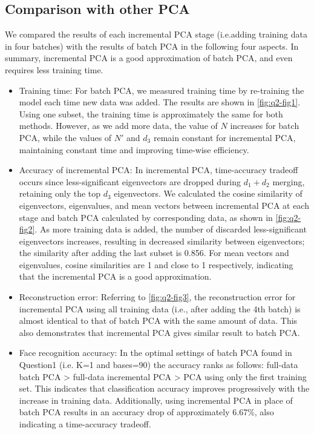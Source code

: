 \subsection{Comparison with other PCA}
We compared the results of each incremental PCA stage (i.e.adding training data in four batches) with the results of batch PCA in the following four aspects. In summary, incremental PCA is a good approximation of batch PCA, and even requires less training time.
\begin{itemize}
	\item Training time: For batch PCA, we measured training time by re-training the model each time new data was added. The results are shown in \cref{fig:q2-fig1}. Using one subset, the training time is approximately the same for both methods. However, as we add more data, the value of $N$ increases for batch PCA, while the values of $N'$ and $d_3$ remain constant for incremental PCA, maintaining constant time and improving time-wise efficiency.
	
	\item Accuracy of incremental PCA: In incremental PCA, time-accuracy tradeoff occurs since less-significant eigenvectors are dropped during $d_1 + d_2$ merging, retaining only the top $d_3$ eigenvectors. We calculated the cosine similarity of eigenvectors, eigenvalues, and mean vectors between incremental PCA at each stage and batch PCA calculated by corresponding data, as shown in \cref{fig:q2-fig2}. As more training data is added, the number of discarded less-significant eigenvectors increases, resulting in decreased similarity between eigenvectors; the similarity after adding the last subset is 0.856. For mean vectors and eigenvalues, cosine similarities are 1 and close to 1 respectively, indicating that the incremental PCA is a good approximation.
	
	\item Reconstruction error: Referring to \cref{fig:q2-fig3}, the reconstruction error for incremental PCA using all training data (i.e., after adding the 4th batch) is almost identical to that of batch PCA with the same amount of data. This also demonstrates that incremental PCA gives similar result to batch PCA.
	
	\item Face recognition accuracy: In the optimal settings of batch PCA found in Question1 (i.e. K=1 and bases=90) the accuracy ranks as follows: full-data batch PCA > full-data incremental PCA > PCA using only the first training set. This indicates that classification accuracy improves progressively with the increase in training data. Additionally, using incremental PCA in place of batch PCA results in an accuracy drop of approximately 6.67\%, also indicating a time-accuracy tradeoff.
	
\end{itemize}

